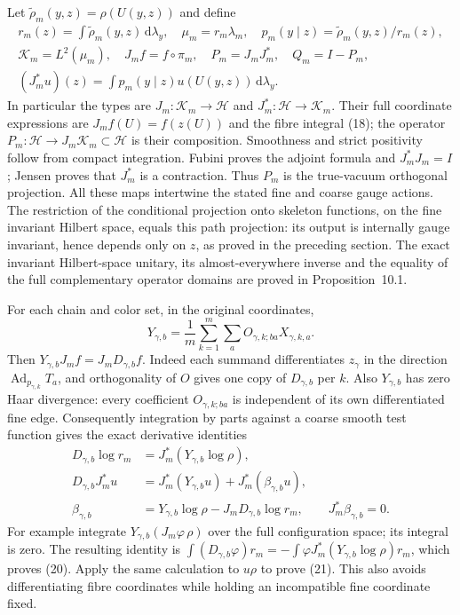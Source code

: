 \documentclass[11pt]{article}
\newcommand{\dd}{\,\mathrm d}
\newcommand{\HH}{\mathscr H}
\newcommand{\KK}{\mathscr K}
\begin{document}
Let $\widetilde\rho_m(y,z)=\rho(U(y,z))$ and define
\begin{gather}
 r_m(z)=\int\widetilde\rho_m(y,z)\dd\lambda_y,
 \quad \mu_m=r_m\lambda_m,\quad
 p_m(y\mid z)=\widetilde\rho_m(y,z)/r_m(z),\label{eq:coarsedensity}\\
 \KK_m=L^2(\mu_m),\quad J_m f=f\circ\pi_m,\quad
 P_m=J_mJ_m^*,\quad Q_m=I-P_m,\nonumber\\
 (J_m^*u)(z)=\int p_m(y\mid z)u(U(y,z))\dd\lambda_y.\label{eq:J}
\end{gather}
In particular the types are $J_m:\KK_m\to\HH$ and
$J_m^*:\HH\to\KK_m$. Their full coordinate expressions are
$J_mf(U)=f(z(U))$ and the fibre integral (18);
the operator $P_m:\HH\to J_m\KK_m\subset\HH$ is their composition.
Smoothness and strict positivity follow from compact integration.
Fubini proves the adjoint formula and $J_m^*J_m=I$; Jensen proves that
$J_m^*$ is a contraction. Thus $P_m$ is the true-vacuum orthogonal
projection. All these maps intertwine the stated fine and coarse gauge
actions. The restriction of the conditional projection onto skeleton
functions, on the fine invariant Hilbert space, equals this path projection:
its output is internally gauge invariant, hence depends only on $z$, as
proved in the preceding section. The exact invariant Hilbert-space
unitary, its almost-everywhere inverse and the equality of the full
complementary operator domains are proved in
Proposition~10.1.

For each chain and color set, in the original coordinates,
\begin{equation}\label{eq:Y}
 Y_{\gamma,b}=\frac1m\sum_{k=1}^m\sum_a
                   O_{\gamma,k;ba}X_{\gamma,k,a}.
\end{equation}
Then $Y_{\gamma,b}J_mf=J_mD_{\gamma,b}f$.
Indeed each summand differentiates $z_\gamma$ in the direction
$\operatorname{Ad}_{p_{\gamma,k}}T_a$, and orthogonality of $O$ gives
one copy of $D_{\gamma,b}$ per $k$.
Also $Y_{\gamma,b}$ has zero Haar divergence: every coefficient
$O_{\gamma,k;ba}$ is independent of its own differentiated fine edge.
Consequently integration by parts against a coarse smooth test function
gives the exact derivative identities
\begin{align}
 D_{\gamma,b}\log r_m&=J_m^*(Y_{\gamma,b}\log\rho),\label{eq:marginalscore}\\
 D_{\gamma,b}J_m^*u
   &=J_m^*(Y_{\gamma,b}u)+J_m^*(\beta_{\gamma,b}u),\label{eq:derivativeJ}\\
 \beta_{\gamma,b}&=Y_{\gamma,b}\log\rho
                       -J_mD_{\gamma,b}\log r_m,\qquad J_m^*\beta_{\gamma,b}=0.
 \label{eq:beta}
\end{align}
For example integrate $Y_{\gamma,b}(J_m\varphi\,\rho)$ over the full
configuration space; its integral is zero. The resulting identity is
$\int(D_{\gamma,b}\varphi)r_m=-\int\varphi J_m^*(Y_{\gamma,b}\log\rho)r_m$,
which proves (20). Apply the same calculation to
$u\rho$ to prove (21). This also avoids differentiating
fibre coordinates while holding an incompatible fine coordinate fixed.
\end{document}
